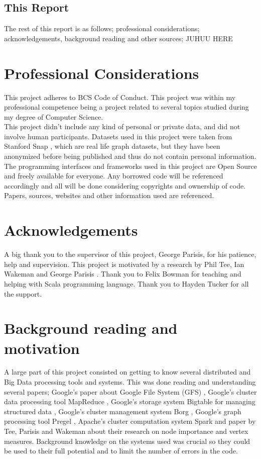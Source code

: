 \documentclass{article}
\theoremstyle{definition}
\begin{document}
\subsection{This Report}
The rest of this report is as follows; professional considerations; acknowledgements, background reading and other sources; JUHUU HERE \\


\section{Professional Considerations}
This project adheres to BCS Code of Conduct. This project was within my professional competence being a project related to several topics studied during my degree of Computer Science. \\

This project didn't include any kind of personal or private data, and did not involve human participants. Datasets used in this project were taken from Stanford Snap \cite{snap}, which are real life graph datasets, but they have been anonymized before being published and thus do not contain personal information. \\

The programming interfaces and frameworks used in this project are Open Source and freely available for everyone. Any borrowed code will be referenced accordingly and all will be done considering copyrights and ownership of code. Papers, sources, websites and other information used are referenced. \\

\section{Acknowledgements}
A big thank you to the supervisor of this project, George Parisis, for his patience, help and supervision. This project is motivated by a research by Phil Tee, Ian Wakeman and George Parisis \cite{Tee2016b}. Thank you to Felix Bowman for teaching and helping with Scala programming language. Thank you to Hayden Tucker for all the support. \\ 

\section{Background reading and motivation}
A large part of this project consisted on getting to know several distributed and Big Data processing tools and systems. This was done reading and understanding several papers; Google's paper about Google File System (GFS) \cite{Ghemawat2003}, Google's cluster data processing tool MapReduce \cite{Dean}, Google's storage system Bigtable for managing structured data \cite{Chang}, Google's cluster management system Borg \cite{Verma}, Google's graph processing tool Pregel \cite{Malewicz2010}, Apache's cluster computation system Spark \cite{Zaharia2012} and paper by Tee, Parisis and Wakeman \cite{Tee2016b} about their research on node importance and vertex measures. Background knowledge on the systems used was crucial so they could be used to their full potential and to limit the number of errors in the code. 
\end{document}
